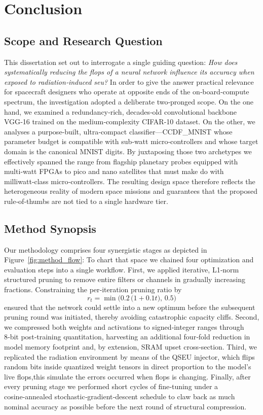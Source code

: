 \chapter{Conclusion}
\label{chap:conclusion}
\section{Scope and Research Question}
This dissertation set out to interrogate a single guiding question: \textit{How does systematically reducing the \gls{flops} of a neural network influence its accuracy when exposed to radiation‑induced \gls{seu}?} 
In order to give the answer practical relevance for spacecraft designers who operate at opposite ends of the on‑board‐compute spectrum, the investigation adopted a deliberate two‑pronged scope. On the one hand, we examined a redundancy‑rich, decades‑old convolutional backbone VGG‑16 trained on the medium‑complexity CIFAR‑10 dataset. On the other, we analyses a purpose‑built, ultra‑compact classifier—CCDF\_MNIST whose parameter budget is compatible with sub‑watt micro‑controllers and whose target domain is the canonical MNIST digits. By juxtaposing those two archetypes we effectively spanned the range from flagship planetary probes equipped with multi‑watt FPGAs to pico and nano satellites that must make do with milliwatt‑class micro‑controllers. The resulting design space therefore reflects the heterogeneous reality of modern space missions and guarantees that the proposed rule‑of‑thumbs are not tied to a single hardware tier.








\section{Method Synopsis}

Our methodology comprises four synergistic stages as depicted in Figure~\ref{fig:method_flow}:
\label{sec:method}
To chart that space we chained four optimization and evaluation steps into a single workflow. First, we applied iterative, L1‑norm structured pruning to remove entire filters or channels in gradually increasing fractions. Constraining the per‑iteration pruning ratio by
\[
r_t = \min\!\bigl(0.2\,\bigl(1+0.1t\bigr),\,0.5\bigr)
\]
ensured that the network could settle into a new optimum before the subsequent pruning round was initiated, thereby avoiding catastrophic capacity cliffs. Second, we compressed both weights and activations to signed‑integer ranges through 8‑bit post‑training quantitation, harvesting an additional four‑fold reduction in model memory footprint and, by extension, SRAM upset cross‑section. Third, we replicated the radiation environment by means of the QSEU injector, which flips random bits inside quantized weight tensors in direct proportion to the model’s live \gls{flops},this simulate the errors occurred when \gls{flops} is changing. Finally, after every pruning stage we performed short cycles of fine‑tuning under a cosine‑annealed stochastic‑gradient‑descent schedule to claw back as much nominal accuracy as possible before the next round of structural compression.



